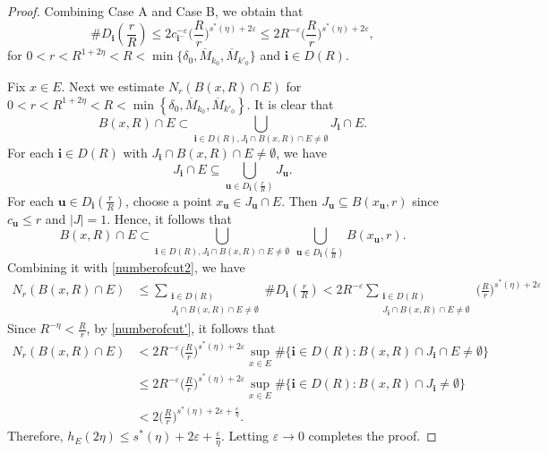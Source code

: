 \documentclass[10pt,a4paper]{amsart}
\newcommand{\bu}{\mathbf{u}}
\newcommand{\de}{\delta}
\newcommand{\eps}{\varepsilon}
\newcommand{\f}{\frac}
\newcommand{\iii}{\mathbf{i}}
\newcommand{\om}{\overline{M}}
\renewcommand{\le}{\leqslant}
\begin{document}
\begin{proof}
		Combining Case A and Case B, we obtain that
		\begin{equation}\label{numberofcut2}
			\#D_{\iii}\left(\f rR\right)\le 2c_{\iii^-}^{-{\eps}}\Big(\f Rr\Big)^{s^*(\eta)+2\eps} \le 2R^{-{\eps}}\Big(\f Rr\Big)^{s^*(\eta)+2\eps},
		\end{equation}
		for $0<r<R^{1+2\eta}<R<\min \{ \de_0,\om_{k_0},\om_{k'_0} \}$ and $\iii\in D(R)$.

		
		Fix $x\in E$. Next we estimate $N_r(B(x,R)\cap E)$ for $0<r<R^{1+2\eta}<R<\min\left\{ \de_0,\om_{k_0},\om_{k'_0}\right\}$. It is clear that
		\[
		B(x,R)\cap E\subset \bigcup_{\iii\in D(R),J_{\iii}\cap B(x,R)\cap E\neq \emptyset} J_{\iii}\cap E.
		\]
		For each $\iii\in D(R)$ with $J_{\iii}\cap B(x,R)\cap E\neq \emptyset$, we have
		\[
		J_{\iii}\cap E\subseteq\bigcup_{\bu\in D_{\iii}\left(\frac r R\right)} J_{\bu}.
		\]
		For each $\bu\in D_{\iii}\left(\frac r R\right)$, choose a point $x_\bu\in J_\bu\cap E$. Then $	J_{\bu}\subseteq B(x_{\bu},r) $ since  $c_{\bu}\le  r$ and $|J|=1$.
		Hence, it follows that 
		\[
		B(x,R)\cap E\subset\bigcup_{\iii\in D(R),J_{\iii}\cap B(x,R)\cap E\neq \emptyset}\ \bigcup_{\bu\in D_{\iii}\left(\frac r R\right)}B(x_{\bu},r).
		\]
		Combining it with \eqref{numberofcut2}, we have 
		\begin{align*}
			N_r(B(x,R)\cap E)&\le \sum_{\substack{\iii\in D(R)\\J_{\iii}\cap B(x,R)\cap E\neq \emptyset}}\# D_{\iii}\left(\frac r R\right)<2R^{-{\eps}}\sum_{\substack{\iii\in D(R)\\J_{\iii}\cap B(x,R)\cap E\neq \emptyset}}\Big(\frac R r\Big)^{s^*(\eta)+2\eps} 
		\end{align*}	
		Since $R^{-\eta}<\f Rr$, by \eqref{numberofcut'}, it follows that 
		\begin{align*}
			N_r(B(x,R)\cap E)
			&<2R^{-{\eps}}\Big(\frac R r\Big)^{s^*(\eta)+2\eps}\sup_{x\in E}\#\{\iii\in D(R):B(x,R)\cap J_{\iii}\cap E\neq \emptyset\}\\
			&\le 2R^{-{\eps}}\Big(\frac R r\Big)^{s^*(\eta)+2\eps}\sup_{x\in E}\#\{\iii\in D(R):B(x,R)\cap J_{\iii}\neq \emptyset\}\\
			&<2\Big(\frac R r\Big)^{s^*(\eta)+2\eps+\f{\eps}{\eta}}.
		\end{align*}
		Therefore, $h_E(2\eta)\le s^*(\eta)+2\eps+\f{\eps}{\eta}.$  Letting $\eps\to 0$ completes the proof.
	\end{proof}
\end{document}

